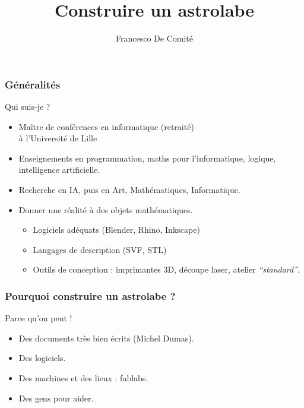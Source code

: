 \documentclass{beamer}
\title[Construire un astrolabe]{Construire un astrolabe}
\author{Francesco De Comité}\institute{Ex-Université de Lille \\ Faculté des Sciences et Technologies}
\begin{document}
 \begin{frame}
\titlepage
{}
   \end{frame}

  
 \begin{frame}\frametitle{Généralités}

\begin{block}{Qui suis-je ? }
\begin{itemize}
\item Maître de conférences en informatique (retraité) \\ à l'Université de Lille
\item Enseignements en programmation, maths pour l'informatique, logique, intelligence artificielle. 
\item Recherche en IA, puis en Art, Mathématiques, Informatique. 
\item \begin{block}{Donner une réalité à des objets mathématiques. }
	\begin{itemize}
	\item Logiciels adéquats (Blender, Rhino, Inkscape)
	\item Langages de description (SVF, STL)
	\item Outils de conception : imprimantes 3D, découpe laser, atelier {\it ``standard''}.
	\end{itemize}
	\end{block}
\end{itemize}
\end{block}

   \end{frame}


  
 \begin{frame}\frametitle{Pourquoi construire un astrolabe ?}
 
 \begin{block}{Parce qu'on peut !}
 \begin{itemize}
 \item Des documents très bien écrits (Michel Dumas).
 \item Des logiciels.
 \item Des machines et des lieux : fablabs. 
 \item Des gens pour aider. 
 \end{itemize}
 
 
 
 \end{block}
 
\end{frame}
\end{document}
